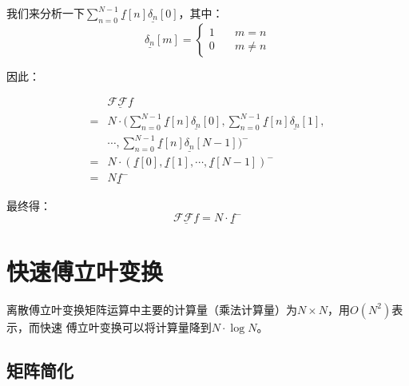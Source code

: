 我们来分析一下$\sum_{n=0}^{N-1}\underline{f}[n]\underline{\delta_n}[0]$，其中：
$$
	\underline{\delta_n}[m]=\begin{cases} 1 & \quad m=n     \\
		0 & \quad m\neq n\end{cases}
$$

因此：

\begin{align*}
	  & \underline{\mathcal{F}\mathcal{F}f}                                                                                      \\
	= & N\cdot (\sum_{n=0}^{N-1}\underline{f}[n]\underline{\delta_n}[0],\sum_{n=0}^{N-1}\underline{f}[n]\underline{\delta_n}[1], \\
	  & \cdots,\sum_{n=0}^{N-1}\underline{f}[n]\underline{\delta_n}[N-1])^-                                                      \\
	= & N\cdot (\underline{f}[0],\underline{f}[1],\cdots,\underline{f}[N-1])^-                                                   \\
	= & N\underline{f}^-
\end{align*}

最终得：
\begin{equation}
	\underline{\mathcal{F}\mathcal{F}f} = N\cdot \underline{f}^-
\end{equation}

\section{快速傅立叶变换}
离散傅立叶变换矩阵运算中主要的计算量（乘法计算量）为$N \times N$，用$O(N^2)$表示，而快速 傅立叶变换可以将计算量降到$N\cdot \log{N}$。
\subsection{矩阵简化}

